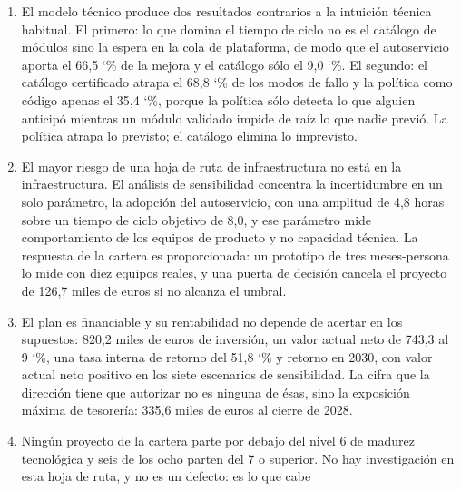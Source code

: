 \documentclass[11pt,letterpaper]{article}
\newcommand{\pct}{\char`\%}  %
\begin{document}
\begin{enumerate}
    cinco de las seis motivaciones estratégicas, la variable que más mueve el
    valor actual neto (434,6 miles de euros entre el 74 y el 86 \pct), el
    90 \pct{} del tiempo de reconstrucción de 2026 y la figura en la que la
    empresa está más lejos de la frontera. La convergencia de cuatro caminos
    distintos sobre la misma magnitud es el argumento más sólido del
    documento, y es lo que justifica que sea el único compromiso que la
    declaración de estrategia señala como irrenunciable.
  \item El modelo técnico produce dos resultados contrarios a la intuición
    técnica habitual. El primero: lo que domina el tiempo de ciclo no es el
    catálogo de módulos sino la espera en la cola de plataforma, de modo que
    el autoservicio aporta el 66,5 \pct{} de la mejora y el catálogo sólo el
    9,0 \pct. El segundo: el catálogo certificado atrapa el 68,8 \pct{} de los
    modos de fallo y la política como código apenas el 35,4 \pct, porque la
    política sólo detecta lo que alguien anticipó mientras un módulo validado
    impide de raíz lo que nadie previó. La política atrapa lo previsto; el
    catálogo elimina lo imprevisto.
  \item El mayor riesgo de una hoja de ruta de infraestructura no está en la
    infraestructura. El análisis de sensibilidad concentra la incertidumbre en
    un solo parámetro, la adopción del autoservicio, con una amplitud de 4,8
    horas sobre un tiempo de ciclo objetivo de 8,0, y ese parámetro mide
    comportamiento de los equipos de producto y no capacidad técnica. La
    respuesta de la cartera es proporcionada: un prototipo de tres
    meses-persona lo mide con diez equipos reales, y una puerta de decisión
    cancela el proyecto de 126,7 miles de euros si no alcanza el umbral.
  \item El plan es financiable y su rentabilidad no depende de acertar en los
    supuestos: 820,2 miles de euros de inversión, un valor actual neto de
    743,3 al 9 \pct, una tasa interna de retorno del 51,8 \pct{} y retorno en
    2030, con valor actual neto positivo en los siete escenarios de
    sensibilidad. La cifra que la dirección tiene que autorizar no es
    ninguna de ésas, sino la exposición máxima de tesorería: 335,6 miles de
    euros al cierre de 2028.
  \item Ningún proyecto de la cartera parte por debajo del nivel 6 de madurez
    tecnológica y seis de los ocho parten del 7 o superior. No hay
    investigación en esta hoja de ruta, y no es un defecto: es lo que cabe

\end{enumerate}
\end{document}
